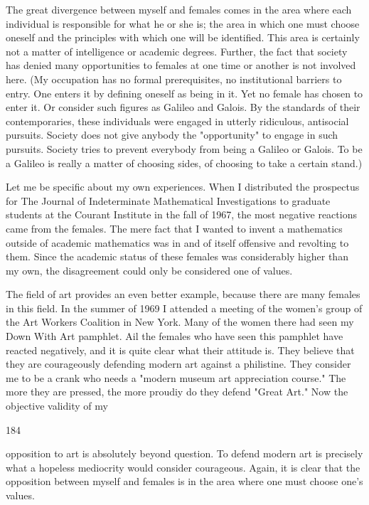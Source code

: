 \documentclass[10pt,twoside]{memoir}
\begin{document}
\begin{enumerate}
{\begin{enumerate}
\begin{sysrules}
\begin{sysrules}
\begin{sysrules}
\begin{sysrules}
{\begin{enumerate}
{{{{{{{The great divergence between myself and females comes in the area 
where each individual is responsible for what he or she is; the area in which 
one must choose oneself and the principles with which one will be identified. 
This area is certainly not a matter of intelligence or academic degrees. 
Further, the fact that society has denied many opportunities to females at 
one time or another is not involved here. (My occupation has no formal 
prerequisites, no institutional barriers to entry. One enters it by defining 
oneself as being in it. Yet no female has chosen to enter it. Or consider such 
figures as Galileo and Galois. By the standards of their contemporaries, these 
individuals were engaged in utterly ridiculous, antisocial pursuits. Society 
does not give anybody the "opportunity" to engage in such pursuits. Society 
tries to prevent everybody from being a Galileo or Galois. To be a Galileo is 
really a matter of choosing sides, of choosing to take a certain stand.) 

Let me be specific about my own experiences. When I distributed the 
prospectus for The Journal of Indeterminate Mathematical Investigations to 
graduate students at the Courant Institute in the fall of 1967, the most 
negative reactions came from the females. The mere fact that I wanted to 
invent a mathematics outside of academic mathematics was in and of itself 
offensive and revolting to them. Since the academic status of these females 
was considerably higher than my own, the disagreement could only be 
considered one of values. 

The field of art provides an even better example, because there are 
many females in this field. In the summer of 1969 I attended a meeting of 
the women's group of the Art Workers Coalition in New York. Many of the 
women there had seen my Down With Art pamphlet. Ail the females who 
have seen this pamphlet have reacted negatively, and it is quite clear what 
their attitude is. They believe that they are courageously defending modern 
art against a philistine. They consider me to be a crank who needs a "modern 
museum art appreciation course." The more they are pressed, the more 
proudiy do they defend "Great Art." Now the objective validity of my 


184 


opposition to art is absolutely beyond question. To defend modern art is 
precisely what a hopeless mediocrity would consider courageous. Again, it is 
clear that the opposition between myself and females is in the area where 
one must choose one's values. 

}}}}}}}
\end{enumerate}}
\end{sysrules}
\end{sysrules}
\end{sysrules}
\end{sysrules}
\end{enumerate}}
\end{enumerate}
\end{document}

